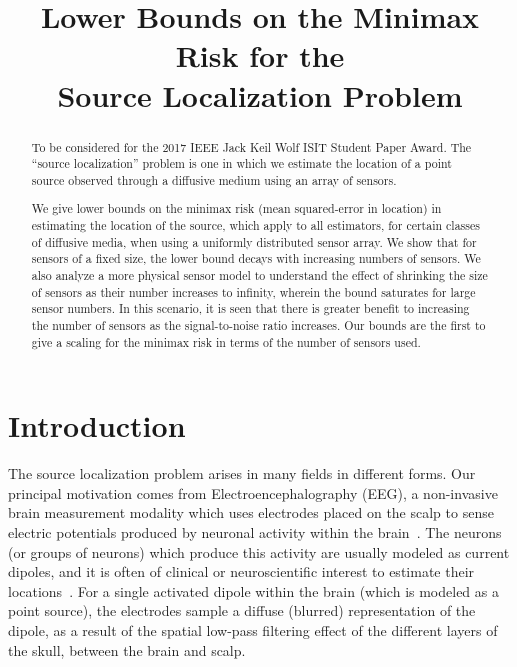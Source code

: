 \documentclass[conference]{IEEEtran}
\title{Lower Bounds on the Minimax Risk for the \\ Source Localization Problem}
\author{
	\IEEEauthorblockN{
		Praveen Venkatesh (\href{mailto:vpraveen@cmu.edu}{\texttt{vpraveen@cmu.edu}}) %
		and Pulkit Grover (\href{mailto:pulkit@cmu.edu}{\texttt{pulkit@cmu.edu}}) %
	}
}
\begin{document}
\maketitle
\thispagestyle{plain}
\pagestyle{plain}

\begin{abstract}

To be considered for the 2017 IEEE Jack Keil Wolf ISIT Student Paper Award.
The ``source localization'' problem is one in which we estimate the location of
a point source observed through a diffusive medium using an array of sensors.

We give lower bounds on the minimax risk (mean squared-error in location) in
estimating the location of the source, which apply to all estimators, for
certain classes of diffusive media, when using a uniformly distributed sensor
array. We show that for sensors of a fixed size, the lower bound decays with
increasing numbers of sensors. We also analyze a more physical sensor model to
understand the effect of shrinking the size of sensors as their number
increases to infinity, wherein the bound saturates for large sensor numbers.
In this scenario, it is seen that there is greater benefit to increasing the
number of sensors as the signal-to-noise ratio increases.  Our bounds are the
first to give a scaling for the minimax risk in terms of the number of sensors
used.


\end{abstract}

\section{Introduction}

The source localization problem arises in many fields in different forms. Our
principal motivation comes from Electroencephalography (EEG), a non-invasive
brain measurement modality which uses electrodes placed on the scalp to sense
electric potentials produced by neuronal activity within the
brain~\cite{Nunez2006Electric}. The neurons (or groups of neurons) which
produce this activity are usually modeled as current dipoles, and it is often
of clinical or neuroscientific interest to estimate their
locations~\cite{Baillet2001Electromagnetic}. For a single activated dipole
within the brain (which is modeled as a point source), the electrodes sample a
diffuse (blurred) representation of the dipole, as a result of the spatial
low-pass filtering effect of the different layers of the skull, between the
brain and scalp.
\end{document}

